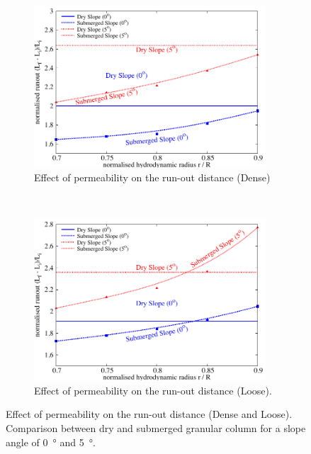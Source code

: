 \begin{figure}
	\centering
\begin{subfigure}[b]{0.95\textwidth}
	\centering
    \includegraphics[width=0.95\textwidth]{Perm_Runout_a08_dense}
    \caption{Effect of permeability on the run-out distance (Dense)}
    \label{fig:Perm_Runout_a08_dense}
\end{subfigure}\\
\begin{subfigure}[b]{0.95\textwidth}
	\centering
    \includegraphics[width=0.95\textwidth]{Perm_Runout_a08_loose}
    \caption{Effect of permeability on the run-out distance (Loose).}
    \label{fig:Perm_Runout_a08_loose}
\end{subfigure}
\caption{Effect of permeability on the run-out distance (Dense and Loose). 
	Comparison between dry and submerged granular column for a slope angle of 
    0~\si{\degree} and 5~\si{\degree}.}
\label{fig:Perm_Runout_loose_dense}
\end{figure}


